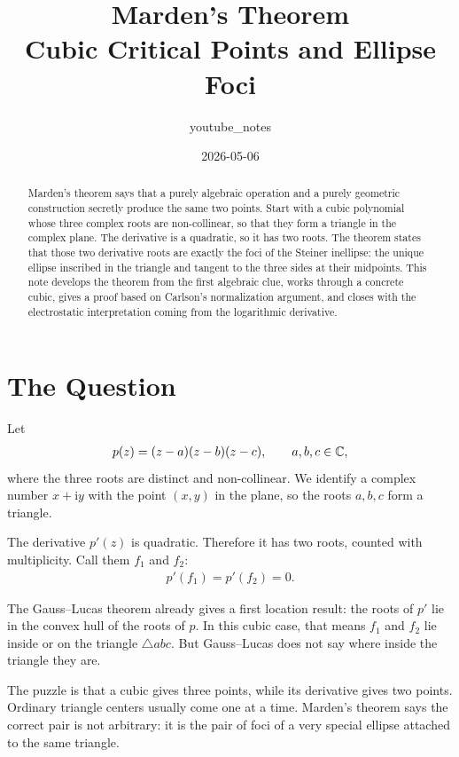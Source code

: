 \documentclass[11pt]{article}
\title{Marden's Theorem\\\large Cubic Critical Points and Ellipse Foci}
\author{youtube\_notes}
\date{2026-05-06}
\newcommand{\ii}{\mathrm{i}}
\begin{document}
\maketitle

\begin{abstract}
Marden's theorem says that a purely algebraic operation and a purely geometric construction secretly produce the same two points. Start with a cubic polynomial whose three complex roots are non-collinear, so that they form a triangle in the complex plane. The derivative is a quadratic, so it has two roots. The theorem states that those two derivative roots are exactly the foci of the Steiner inellipse: the unique ellipse inscribed in the triangle and tangent to the three sides at their midpoints. This note develops the theorem from the first algebraic clue, works through a concrete cubic, gives a proof based on Carlson's normalization argument, and closes with the electrostatic interpretation coming from the logarithmic derivative.
\end{abstract}

\tableofcontents
\newpage

\section{The Question}

Let
\begin{align}
  p(z)=(z-a)(z-b)(z-c),
  \qquad a,b,c\in \mathbb{C},
  \label{eq:cubic-from-roots}
\end{align}
where the three roots are distinct and non-collinear. We identify a complex number \(x+\ii y\) with the point \((x,y)\) in the plane, so the roots \(a,b,c\) form a triangle.

The derivative \(p'(z)\) is quadratic. Therefore it has two roots, counted with multiplicity. Call them \(f_1\) and \(f_2\):
\begin{align}
  p'(f_1)=p'(f_2)=0.
\end{align}

The Gauss--Lucas theorem already gives a first location result: the roots of \(p'\) lie in the convex hull of the roots of \(p\). In this cubic case, that means \(f_1\) and \(f_2\) lie inside or on the triangle \(\triangle abc\). But Gauss--Lucas does not say where inside the triangle they are.

\begin{intuitionbox}
The puzzle is that a cubic gives three points, while its derivative gives two points. Ordinary triangle centers usually come one at a time. Marden's theorem says the correct pair is not arbitrary: it is the pair of foci of a very special ellipse attached to the same triangle.
\end{intuitionbox}
\end{document}
